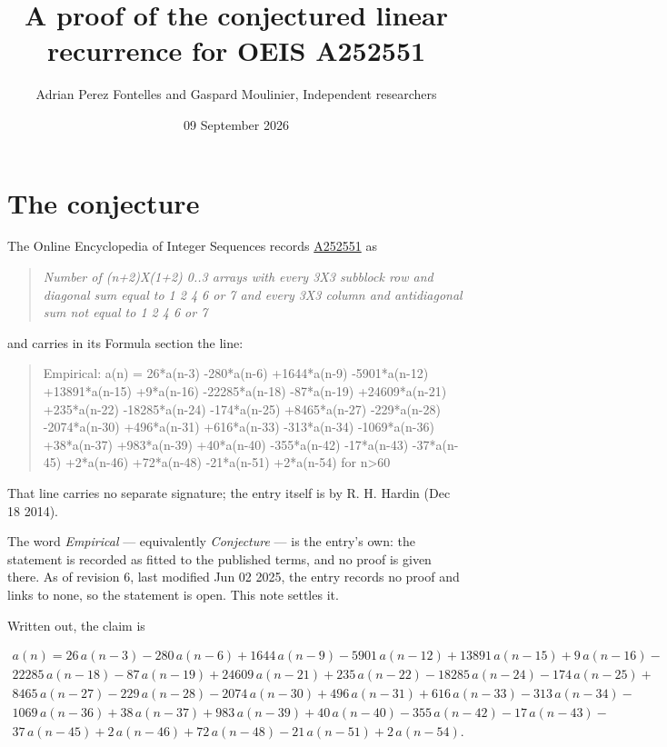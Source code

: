 \documentclass[11pt]{article}
\title{A proof of the conjectured linear recurrence for OEIS A252551}
\author{Adrian Perez Fontelles and Gaspard Moulinier, Independent researchers}
\date{09 September 2026}
\theoremstyle{definition}
\begin{document}
\maketitle
\section{The conjecture}

The Online Encyclopedia of Integer Sequences records \href{https://oeis.org/A252551}{A252551} as

\begin{quote}\itshape Number of (n+2)X(1+2) 0..3 arrays with every 3X3 subblock row and diagonal sum equal to 1 2 4 6 or 7 and every 3X3 column and antidiagonal sum not equal to 1 2 4 6 or 7\end{quote}

and carries in its Formula section the line:

\begin{quote}\ttfamily Empirical: a(n) = 26*a(n-3) -280*a(n-6) +1644*a(n-9) -5901*a(n-12) +13891*a(n-15) +9*a(n-16) -22285*a(n-18) -87*a(n-19) +24609*a(n-21) +235*a(n-22) -18285*a(n-24) -174*a(n-25) +8465*a(n-27) -229*a(n-28) -2074*a(n-30) +496*a(n-31) +616*a(n-33) -313*a(n-34) -1069*a(n-36) +38*a(n-37) +983*a(n-39) +40*a(n-40) -355*a(n-42) -17*a(n-43) -37*a(n-45) +2*a(n-46) +72*a(n-48) -21*a(n-51) +2*a(n-54) for n>60\end{quote}

That line carries no separate signature; the entry itself is by R. H. Hardin (Dec 18 2014).

The word {\itshape Empirical} --- equivalently {\itshape Conjecture} --- is the entry's own: the statement is recorded as fitted to the published terms, and no proof is given there. As of revision 6, last modified Jun 02 2025, the entry records no proof and links to none, so the statement is open. This note settles it.

Written out, the claim is

\begin{multline*} a(n) = 26\,a(n-3) - 280\,a(n-6) + 1644\,a(n-9) - 5901\,a(n-12) + 13891\,a(n-15) + 9\,a(n-16) - \\ 22285\,a(n-18) - 87\,a(n-19) + 24609\,a(n-21) + 235\,a(n-22) - 18285\,a(n-24) - 174\,a(n-25) + \\ 8465\,a(n-27) - 229\,a(n-28) - 2074\,a(n-30) + 496\,a(n-31) + 616\,a(n-33) - 313\,a(n-34) - \\ 1069\,a(n-36) + 38\,a(n-37) + 983\,a(n-39) + 40\,a(n-40) - 355\,a(n-42) - 17\,a(n-43) - \\ 37\,a(n-45) + 2\,a(n-46) + 72\,a(n-48) - 21\,a(n-51) + 2\,a(n-54). \end{multline*}
\end{document}
